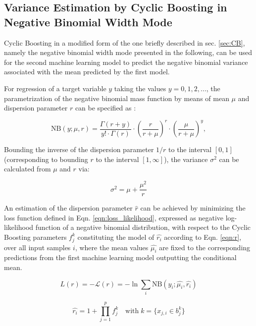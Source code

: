\documentclass[BCOR=1mm, DIV=calc,10pt,
twoside=true,
twocolumn,
headings=normal]{scrartcl}
\newcommand{\eqn}{Eqn. }
\begin{document}
\subsection{Variance Estimation by Cyclic Boosting in Negative Binomial Width Mode}

Cyclic Boosting in a modified form of the one briefly described in sec. \ref{sec:CB}, namely the negative binomial width mode presented in the following, can be used for the second machine learning model to predict the negative binomial variance associated with the mean predicted by the first model.

For regression of a target variable $y$ taking the values $y = 0, 1, 2, ...$, the parametrization of the negative binomial mass function by means of mean $\mu$ and dispersion parameter $r$ can be specified as \cite{hilbe2011negative}:

\begin{equation} \label{eqn:nbinom}
\mathrm{NB}(y; \mu, r) = \frac{\Gamma(r + y)}{y! \cdot \Gamma(r)} \cdot \left(\frac{r}{r + \mu}\right)^r \cdot \left(\frac{\mu}{r + \mu}\right)^y,
\end{equation}

Bounding the inverse of the dispersion parameter $1/r$ to the interval $[0, 1]$ (corresponding to bounding $r$ to the interval $[1, \infty]$), the variance $\sigma^2$ can be calculated from $\mu$ and $r$ via:

\begin{equation} \label{eqn:variance_r}
\sigma^2 = \mu + \frac{\mu^2}{r}
\end{equation}

An estimation of the dispersion parameter $\hat{r}$ can be achieved by minimizing the loss function defined in \eqn \eqref{eqn:loss_likelihood}, expressed as negative log-likelihood function of a negative binomial distribution, with respect to the Cyclic Boosting parameters $f^k_j$ constituting the model of $\hat{r_i}$ according to \eqn \eqref{eqn:r}, over all input samples $i$, where the mean values $\hat{\mu_i}$ are fixed to the corresponding predictions from the first machine learning model outputting the conditional mean.

\begin{equation} \label{eqn:loss_likelihood}
L(r) = -\mathcal{L}(r) = -\ln \sum_i \mathrm{NB}(y_i; \hat{\mu_i}, \hat{r_i})
\end{equation}

\begin{equation} \label{eqn:r}
\hat{r_i} = 1 + \prod \limits_{j=1}^p f^k_j \quad \text{with}\; k=\{ x_{j,i} \in b^k_j\}
\end{equation}
\end{document}
